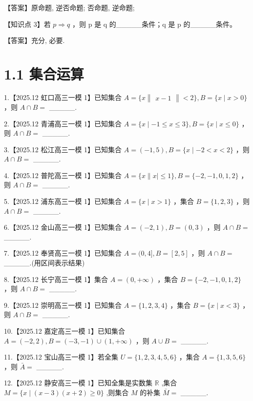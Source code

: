 \documentclass[10pt]{article}
\begin{document}
【答案】原命题, 逆否命题; 否命题, 逆命题;

【知识点 3】若 \(p \Rightarrow  q\) ，则 p 是 q 的\_\_\_\_\_条件；q 是 p 的\_\_\_\_\_条件。

【答案】充分, 必要.

\section*{1.1 集合运算}

1.【2025.12 虹口高三一模 1】已知集合 \(A = \{ x\begin{Vmatrix}{x - 1}\end{Vmatrix} < 2\} ,B = \{ x \mid  x > 0\}\) ，则 \(A \cap  B =\) \_\_\_\_\_.

2.【2025.12 青浦高三一模 1】已知集合 \(A = \{ x \mid   - 1 \leq  x \leq  3\} ,B = \{ x \mid  x \leq  0\}\) ，则 \(A \cap  B =\) \_\_\_\_\_.

3.【2025.12 松江高三一模 1】已知集合 \(A = \left( {-1,5}\right) ,B = \{ x \mid   - 2 < x < 2\}\) ，则 \(A \cap  B =\) \_\_\_\_\_.

4.【2025.12 普陀高三一模 1】已知集合 \(A = \{ x\parallel x \mid   \leq  1\} ,B = \{  - 2, - 1,0,1,2\}\) ，则 \(A \cap  B =\) \_\_\_\_\_.

5.【2025.12 浦东高三一模 1】已知集合 \(A = \{ x \mid  x > 1\}\) ，集合 \(B = \{ 1,2,3\}\) ，则 \(A \cap  B =\) \_\_\_\_\_.

6.【2025.12 金山高三一模 1】已知集合 \(A = \left( {-2,1}\right) ,B = \left( {0,3}\right)\) ，则 \(A \cap  B =\) \_\_\_\_\_.

7.【2025.12 奉贤高三一模 1】已知集合 \(A = (0,4\rbrack ,B = \left\lbrack  {2,5}\right\rbrack\) ，则 \(A \cap  B =\) \_\_\_\_\_.(用区间表示结果)

8.【2025.12 长宁高三一模 1】集合 \(A = \left( {0, + \infty }\right)\) ，集合 \(B = \{  - 2, - 1,0,1,2\}\) ，则 \(A \cap  B =\) \_\_\_\_\_.

9.【2025.12 崇明高三一模 1】已知集合 \(A = \{ 1,2,3,4\}\) ，集合 \(B = \{ x \mid  x < 3\}\) ，则 \(A \cap  B =\) \_\_\_\_\_.

10.【2025.12 嘉定高三一模 1】已知集合 \(A = \left( {-2,2}\right) ,B = \left( {-3, - 1}\right)  \cup  \left( {1, + \infty }\right)\) ，则 \(A \cup  B =\) \_\_\_\_\_.

11.【2025.12 宝山高三一模 1】若全集 \(U = \{ 1,2,3,4,5,6\}\) ，集合 \(A = \{ 1,3,5,6\}\) ，则 \(\bar{A} =\) \_\_\_\_\_.

12.【2025.12 静安高三一模 1】已知全集是实数集 \(\mathbb{R}\) ,集合 \(M = \{ x \mid  \left( {x - 3}\right) \left( {x + 2}\right)  \geq  0\}\) ,则集合 \(M\) 的补集 \(\bar{M} =\) \_\_\_\_\_.
\end{document}
